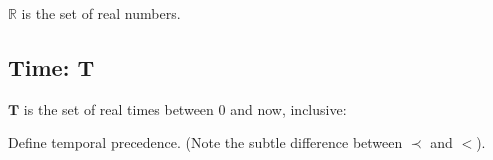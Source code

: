 $\mathbb{R}$ is the set of real numbers.  

\subsection{Time: $\mathbf{T}$}\label{sec:time}

$\mathbf{T}$ is the set of real times between 0 and now, inclusive:

\dfbltime


\pn Define temporal precedence.  (Note the subtle difference between $\prec$ and $<$).

\dfblbefore


